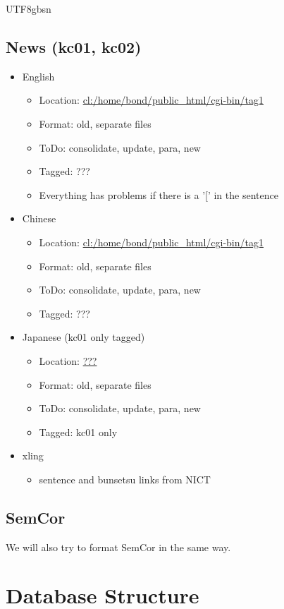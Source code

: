 \documentclass[12pt]{book} %
\begin{document}
\begin{CJK}{UTF8}{gbsn}
\section{News (kc01, kc02)}
\begin{itemize}
\item English
  \begin{itemize}
  \item Location: \url{cl:/home/bond/public_html/cgi-bin/tag1}
  \item Format: old, separate files
  \item ToDo: consolidate, update, para, new
  \item Tagged: ???
  \item Everything has problems if there is a '[' in the sentence
  \end{itemize}
\item Chinese
  \begin{itemize}
  \item Location: \url{cl:/home/bond/public_html/cgi-bin/tag1}
  \item Format: old, separate files
  \item ToDo: consolidate, update, para, new
  \item Tagged: ???
  \end{itemize}
\item Japanese (kc01 only tagged)
  \begin{itemize}
  \item Location: \url{???}
  \item Format: old, separate files
  \item ToDo: consolidate, update, para, new
  \item Tagged: kc01 only
  \end{itemize}
\item xling
  \begin{itemize}
  \item sentence and bunsetsu links from NICT
  \end{itemize}
\end{itemize}



\section{SemCor}

We will also try to format SemCor in the same way.


\chapter{Database Structure}


\end{CJK}
\end{document}
